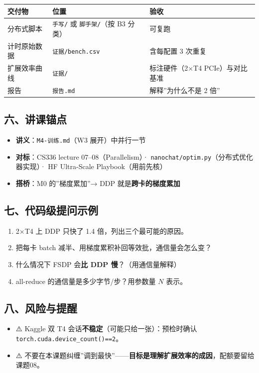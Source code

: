 \documentclass[
  chinese,
  11pt,
]{ctexart}
\newcounter{none} %
\providecommand{\tightlist}{%
  \setlength{\itemsep}{0pt}\setlength{\parskip}{0pt}}
\begin{document}
{\def\LTcaptype{none} %
\begin{longtable}[]{@{}lll@{}}
\toprule\noalign{}
交付物 & 位置 & 验收 \\
\midrule\noalign{}
\endhead
\bottomrule\noalign{}
\endlastfoot
分布式脚本 & \texttt{手写/} 或 \texttt{脚手架/}（按 B3 分类） & 可复跑 \\
计时原始数据 & \texttt{证据/bench.csv} & 含每配置 3 次重复 \\
扩展效率曲线 & \texttt{证据/} & 标注硬件（2×T4 PCIe）与对比基准 \\
报告 & \texttt{报告.md} & 解释''为什么不是 2 倍'' \\
\end{longtable}
}

\subsection{六、讲课锚点}\label{ux516dux8bb2ux8bfeux951aux70b9}

\begin{itemize}
\tightlist
\item
  \textbf{讲义}：\texttt{M4-训练.md}（W3 展开）中并行一节
\item
  \textbf{对标}：CS336 lecture 07--08（Parallelism）· \texttt{nanochat/optim.py}（分布式优化器实现）· HF Ultra-Scale Playbook（用前先核）
\item
  \textbf{搭桥}：M0 的''梯度累加''→ DDP 就是\textbf{跨卡的梯度累加}
\end{itemize}

\subsection{七、代码级提问示例}\label{ux4e03ux4ee3ux7801ux7ea7ux63d0ux95eeux793aux4f8b}

\begin{enumerate}
\def\labelenumi{\arabic{enumi}.}
\tightlist
\item
  2×T4 上 DDP 只快了 1.4 倍，列出三个最可能的原因。
\item
  把每卡 batch 减半、用梯度累积补回等效批，通信量会怎么变？
\item
  什么情况下 FSDP 会\textbf{比 DDP 慢}？（用通信量解释）
\item
  all-reduce 的通信量是多少字节/步？用参数量 \(N\) 表示。
\end{enumerate}

\subsection{八、风险与提醒}\label{ux516bux98ceux9669ux4e0eux63d0ux9192}

\begin{itemize}
\tightlist
\item
  ⚠️ Kaggle 双 T4 会话\textbf{不稳定}（可能只给一张）：预检时确认 \texttt{torch.cuda.device\_count()==2}。
\item
  ⚠️ 不要在本课题纠缠''调到最快''------\textbf{目标是理解扩展效率的成因}，配额要留给课题08。
\end{itemize}
\end{document}
